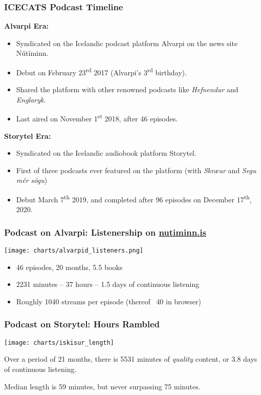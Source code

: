 \begin{frame}
    \frametitle{ICECATS Podcast Timeline}

    \textbf{Alvarpi\dh{} Era:}
    \begin{itemize}
        \item Syndicated on the Icelandic podcast platform Alvarpi\dh{} on the news site N\'{u}t\'{i}minn.
        \item Debut on February 23\textsuperscript{rd} 2017 (Alvarpi\dh's 3\textsuperscript{rd} birthday).
        \item Shared the platform with other renowned podcasts like \emph{Hefnendur} and \emph{Englaryk}.
        \item Last aired on November 1\textsuperscript{st} 2018, after 46 episodes.
    \end{itemize}

    \textbf{Storytel Era:}
    \begin{itemize}
        \item Syndicated on the Icelandic audiobook platform Storytel.
        \item First of three podcasts ever featured on the platform
        (with \emph{Skr\ae{}\dh{}ur} and \emph{Seg\dh{}u m\'{e}r s\"{o}gu})
        \item Debut March 7\textsuperscript{th} 2019, and completed after
        96 episodes on December 17\textsuperscript{th}, 2020.
    \end{itemize}

\end{frame}


\begin{frame}
    \frametitle{Podcast on Alvarpi\dh{}: Listenership on \url{nutiminn.is}}
    \texttt{[image: charts/alvarpid\_listeners.png]}

    \begin{itemize}
        \item 46 episodes, 20 months, 5.5 books
        \item 2231 minutes -- 37 hours -- 1.5 days of continuous listening
        \item Roughly 1040 streams per episode (thereof ~40 in browser)
    \end{itemize}

\end{frame}


\begin{frame}
    \frametitle{Podcast on Storytel: Hours Rambled}
    \texttt{[image: charts/iskisur\_length]}

    Over a period of 21 months, there is 5531 minutes of \emph{quality} content, or 3.8 days of continuous
    listening.

    Median length is 59 minutes, but never surpassing 75 minutes.

\end{frame}

